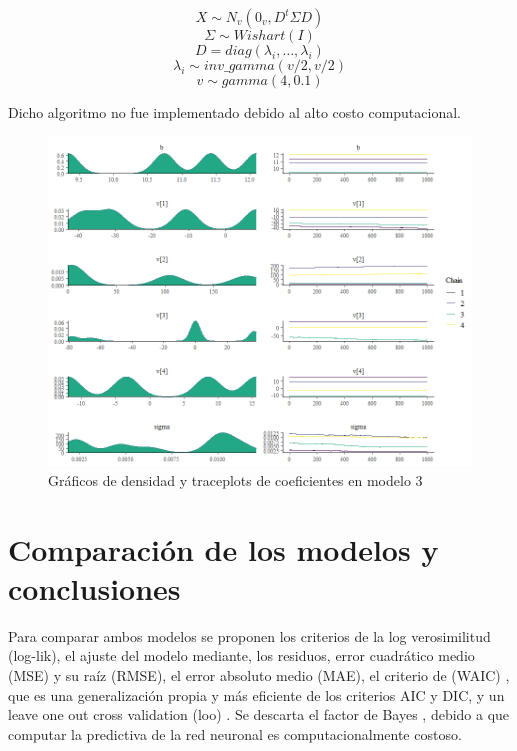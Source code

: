\documentclass[nojss]{jss}
\begin{document}
$$X \sim N_v(0_v,D^t\Sigma D)$$
$$\Sigma  \sim Wishart(I)$$
$$D = diag(\lambda_i,\ldots,\lambda_i)$$
$$\lambda_i \sim inv\_gamma(v/2,v/2)$$
$$v \sim gamma(4,0.1)$$

Dicho algoritmo no fue implementado debido al alto costo computacional.


\begin{figure}[H]
	\centering
	\includegraphics[scale=0.8]{images/traceplot3}
	\caption[trace3]{Gráficos de densidad y traceplots de coeficientes en modelo 3}
	\label{fig:fig8}
\end{figure}


\section{Comparación de los modelos y conclusiones}

Para comparar ambos modelos se proponen los criterios de la log verosimilitud (log-lik), el ajuste del modelo mediante, los residuos, error cuadrático medio (MSE) y su raíz (RMSE), el error absoluto medio (MAE), el criterio de \cite{watanabe} (WAIC) , que es una generalización propia y más eficiente de los criterios AIC y DIC,  y un leave one out cross validation (loo) \cite{loo}.  Se descarta el factor de Bayes \cite{bayesfactor}, debido a que computar la predictiva de la red neuronal es computacionalmente costoso.\\
\end{document}

